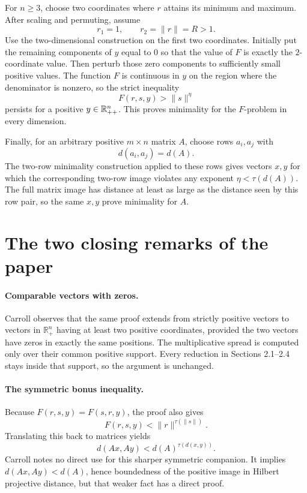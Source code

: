 For $n\ge3$, choose two coordinates where $r$ attains its minimum and maximum.
After scaling and permuting, assume
\[
  r_1=1,
  \qquad
  r_2=\|r\|=R>1.
\]
Use the two-dimensional construction on the first two coordinates.  Initially put the
remaining components of $y$ equal to $0$ so that the value of $F$ is exactly the
$2$-coordinate value.  Then perturb those zero components to sufficiently small
positive values.  The function $F$ is continuous in $y$ on the region where the
denominator is nonzero, so the strict inequality
\[
  F(r,s,y)>\|s\|^\eta
\]
persists for a positive $y\in\mathbb{R}^n_{++}$.  This proves minimality for the $F$-problem
in every dimension.

Finally, for an arbitrary positive $m\times n$ matrix $A$, choose rows $a_i,a_j$ with
\[
  d(a_i,a_j)=d(A).
\]
The two-row minimality construction applied to these rows gives vectors $x,y$ for
which the corresponding two-row image violates any exponent $\eta<\tau(d(A))$.
The full matrix image has distance at least as large as the distance seen by this row
pair, so the same $x,y$ prove minimality for $A$.

\section*{The two closing remarks of the paper}

\paragraph{Comparable vectors with zeros.}
Carroll observes that the same proof extends from strictly positive vectors to vectors in $\mathbb{R}_+^n$ having at least two positive coordinates, provided the two vectors have zeros in exactly the same positions.  The multiplicative spread is computed only over their common positive support.  Every reduction in Sections 2.1--2.4 stays inside that support, so the argument is unchanged.

\paragraph{The symmetric bonus inequality.}
Because $F(r,s,y)=F(s,r,y)$, the proof also gives
\[
 F(r,s,y)<\|r\|^{\tau(\|s\|)}.
\]
Translating this back to matrices yields
\[
 d(Ax,Ay)<d(A)^{\tau(d(x,y))}.
\]
Carroll notes no direct use for this sharper symmetric companion.  It implies $d(Ax,Ay)<d(A)$, hence boundedness of the positive image in Hilbert projective distance, but that weaker fact has a direct proof.

